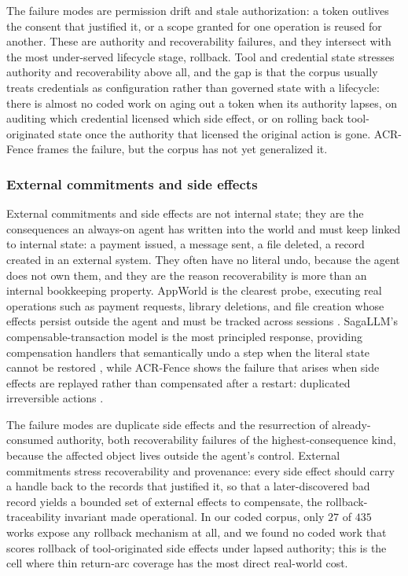 The failure modes are permission drift and stale authorization: a token outlives the consent that justified it, or a scope granted for one operation is reused for another. These are authority and recoverability failures, and they intersect with the most under-served lifecycle stage, rollback. Tool and credential state stresses authority and recoverability above all, and the gap is that the corpus usually treats credentials as configuration rather than governed state with a lifecycle: there is almost no coded work on aging out a token when its authority lapses, on auditing which credential licensed which side effect, or on rolling back tool-originated state once the authority that licensed the original action is gone. ACR-Fence frames the failure, but the corpus has not yet generalized it.

\subsubsection{External commitments and side effects}

External commitments and side effects are not internal state; they are the consequences an always-on agent has written into the world and must keep linked to internal state: a payment issued, a message sent, a file deleted, a record created in an external system. They often have no literal undo, because the agent does not own them, and they are the reason recoverability is more than an internal bookkeeping property. AppWorld is the clearest probe, executing real operations such as payment requests, library deletions, and file creation whose effects persist outside the agent and must be tracked across sessions \citep{trivedi-etal-2024-appworld}. SagaLLM's compensable-transaction model is the most principled response, providing compensation handlers that semantically undo a step when the literal state cannot be restored \citep{chang2025sagallm}, while ACR-Fence shows the failure that arises when side effects are replayed rather than compensated after a restart: duplicated irreversible actions \citep{zheng2026acrfence}.

The failure modes are duplicate side effects and the resurrection of already-consumed authority, both recoverability failures of the highest-consequence kind, because the affected object lives outside the agent's control. External commitments stress recoverability and provenance: every side effect should carry a handle back to the records that justified it, so that a later-discovered bad record yields a bounded set of external effects to compensate, the rollback-traceability invariant made operational. In our coded corpus, only $27$ of $435$ works expose any rollback mechanism at all, and we found no coded work that scores rollback of tool-originated side effects under lapsed authority; this is the cell where thin return-arc coverage has the most direct real-world cost.

